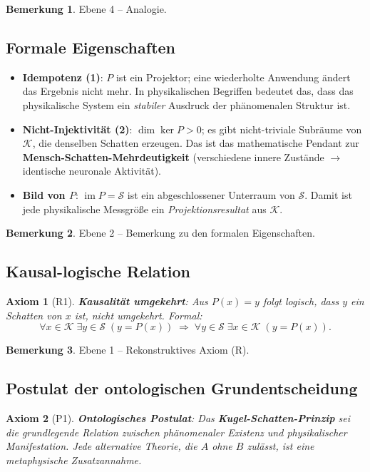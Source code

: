 \documentclass[11pt,a4paper]{article}
\theoremstyle{definition}
\newtheorem{remark}{Bemerkung}[section]
\theoremstyle{plain}
\newtheorem{axiom}{Axiom}[section]
\begin{document}
\begin{remark}
Ebene 4 – Analogie.
\end{remark}

\subsection{Formale Eigenschaften}
\begin{itemize}
  \item \textbf{Idempotenz (1)}: $P$ ist ein Projektor; eine wiederholte
        Anwendung ändert das Ergebnis nicht mehr. In physikalischen
        Begriffen bedeutet das, dass das physikalische System ein
        \emph{stabiler} Ausdruck der phänomenalen Struktur ist.
  \item \textbf{Nicht-Injektivität (2)}: $\dim\ker P>0$; es gibt
        nicht-triviale Subräume von $\mathcal{K}$, die denselben Schatten
        erzeugen. Das ist das mathematische Pendant zur \textbf{Mensch-Schatten-Mehrdeutigkeit}
        (verschiedene innere Zustände $\rightarrow$ identische neuronale Aktivität).
  \item \textbf{Bild von $P$}: $\operatorname{im}P=\mathcal{S}$ ist ein
        abgeschlossener Unterraum von $\mathcal{S}$. Damit ist jede
        physikalische Messgröße ein \emph{Projektionsresultat} aus
        $\mathcal{K}$.
\end{itemize}

\begin{remark}
Ebene 2 – Bemerkung zu den formalen Eigenschaften.
\end{remark}

\subsection{Kausal-logische Relation}
\begin{axiom}[R1]
\textbf{Kausalität umgekehrt}: Aus $P(x)=y$ folgt \emph{logisch},
dass $y$ ein Schatten von $x$ ist, nicht umgekehrt. Formal:
\[
   \forall x\in\mathcal{K}\;\exists y\in\mathcal{S}\;(y=P(x))
   \;\Longrightarrow\;
   \forall y\in\mathcal{S}\;\exists x\in\mathcal{K}\;(y=P(x)).
\]
\end{axiom}

\begin{remark}
Ebene 1 – Rekonstruktives Axiom (R).
\end{remark}

\subsection{Postulat der ontologischen Grundentscheidung}
\begin{axiom}[P1]
\textbf{Ontologisches Postulat}: Das \textbf{Kugel-Schatten-Prinzip}
sei die \emph{grundlegende} Relation zwischen phänomenaler
Existenz und physikalischer Manifestation. Jede alternative
Theorie, die $A$ ohne $B$ zulässt, ist eine metaphysische Zusatzannahme.
\end{axiom}
\end{document}
